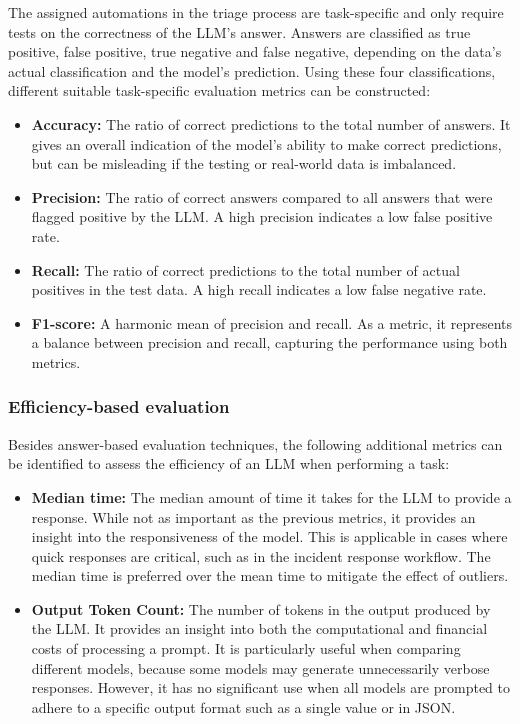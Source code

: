 The assigned automations in the triage process are task-specific and only require tests on the correctness of the LLM's
answer.
Answers are classified as true positive, false positive, true negative and false negative, depending on the data's
actual classification and the model's prediction.
Using these four classifications, different suitable task-specific evaluation metrics can be constructed:
\begin{itemize}
    \item \textbf{Accuracy:} The ratio of correct predictions to the total number of answers.
    It gives an overall indication of the model's ability to make correct predictions, but can be misleading if the
    testing or real-world data is imbalanced.

    \item \textbf{Precision:} The ratio of correct answers compared to all answers that were flagged positive by the
    LLM\@.
    A high precision indicates a low false positive rate.

    \item \textbf{Recall:} The ratio of correct predictions to the total number of actual positives in the test data.
    A high recall indicates a low false negative rate.

    \item \textbf{F1-score:} A harmonic mean of precision and recall.
    As a metric, it represents a balance between precision and recall, capturing the performance using both metrics.
\end{itemize}

\subsubsection{Efficiency-based evaluation}

Besides answer-based evaluation techniques, the following additional metrics can be identified to assess the efficiency
of an LLM when performing a task:
\begin{itemize}
    \item \textbf{Median time:} The median amount of time it takes for the LLM to provide a response.
    While not as important as the previous metrics, it provides an insight into the responsiveness of the model.
    This is applicable in cases where quick responses are critical, such as in the incident response workflow.
    The median time is preferred over the mean time to mitigate the effect of outliers.

    \item \textbf{Output Token Count:} The number of tokens in the output produced by the LLM\@.
    It provides an insight into both the computational and financial costs of processing a prompt.
    It is particularly useful when comparing different models, because some models may generate unnecessarily verbose
    responses.
    However, it has no significant use when all models are prompted to adhere to a specific output format such as a
    single value or in JSON\@.
\end{itemize}

